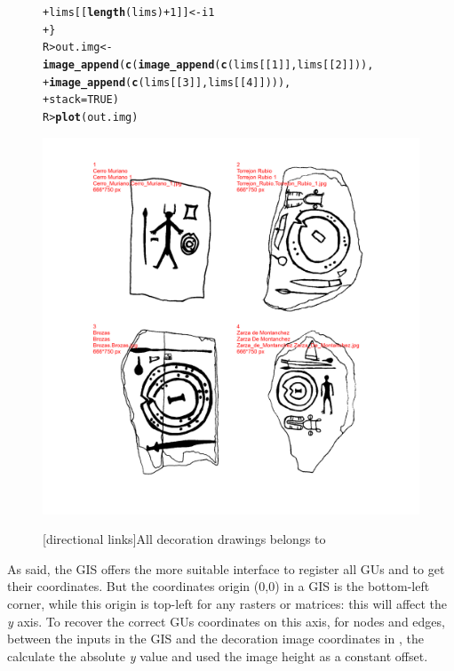 \documentclass[article]{jss}\usepackage[]{graphicx}\usepackage[]{color}
\makeatletter
\def\maxwidth{ %
  \ifdim\Gin@nat@width>\linewidth
    \linewidth
  \else
    \Gin@nat@width
  \fi
}
\newcommand{\hlnum}[1]{\textcolor[rgb]{0.686,0.059,0.569}{#1}}%
\newcommand{\hlopt}[1]{\textcolor[rgb]{0,0,0}{#1}}%
\newcommand{\hlstd}[1]{\textcolor[rgb]{0.345,0.345,0.345}{#1}}%
\newcommand{\hlkwb}[1]{\textcolor[rgb]{0.69,0.353,0.396}{#1}}%
\newcommand{\hlkwc}[1]{\textcolor[rgb]{0.333,0.667,0.333}{#1}}%
\newcommand{\hlkwd}[1]{\textcolor[rgb]{0.737,0.353,0.396}{\textbf{#1}}}%
\newenvironment{kframe}{%
 \def\at@end@of@kframe{}%
 \ifinner\ifhmode%
  \def\at@end@of@kframe{\end{minipage}}%
  \begin{minipage}{\columnwidth}%
 \fi\fi%
 \def\FrameCommand##1{\hskip\@totalleftmargin \hskip-\fboxsep
 \colorbox{shadecolor}{##1}\hskip-\fboxsep
     \hskip-\linewidth \hskip-\@totalleftmargin \hskip\columnwidth}%
 \MakeFramed {\advance\hsize-\width
   \@totalleftmargin\z@ \linewidth\hsize
   \@setminipage}}%
 {\par\unskip\endMakeFramed%
 \at@end@of@kframe}
\newenvironment{knitrout}{}{} %
\makeatother
\begin{document}
\begin{figure}[H]
\begin{knitrout}
\begin{kframe}
\begin{alltt}
\hlstd{+ }  \hlstd{lims[[}\hlkwd{length}\hlstd{(lims)}\hlopt{+}\hlnum{1}\hlstd{]]}\hlkwb{<-} \hlstd{i1}
\hlstd{+ }\hlstd{\}}
\hlstd{R> }\hlstd{out.img} \hlkwb{<-} \hlkwd{image_append}\hlstd{(}\hlkwd{c}\hlstd{(}\hlkwd{image_append}\hlstd{(}\hlkwd{c}\hlstd{(lims[[}\hlnum{1}\hlstd{]],lims[[}\hlnum{2}\hlstd{]])),}
\hlstd{+ }                          \hlkwd{image_append}\hlstd{(}\hlkwd{c}\hlstd{(lims[[}\hlnum{3}\hlstd{]],lims[[}\hlnum{4}\hlstd{]]))),}
\hlstd{+ }                        \hlkwc{stack} \hlstd{=} \hlnum{TRUE}\hlstd{)}
\hlstd{R> }\hlkwd{plot}\hlstd{(out.img)}
\end{alltt}
\end{kframe}
\includegraphics[width=\maxwidth]{figure/unnamed-chunk-4-1} 

\end{knitrout}
[directional links]{All decoration drawings belongs to \citep{DiazGuardamino10}}
\end{figure}

As said, the GIS offers the more suitable interface to register all GUs and to get their coordinates. But the coordinates origin (0,0) in a GIS is the bottom-left corner, while this origin is top-left for any  rasters or matrices: this will affect the \emph{y} axis. To recover the correct GUs coordinates on this axis, for nodes and edges, between the inputs in the GIS and the decoration image coordinates in , the  calculate the absolute \emph{y} value and used the image height as a constant offset. 
\end{document}
